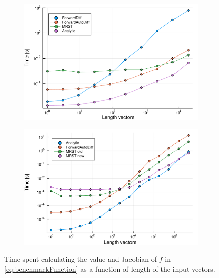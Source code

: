 \begin{figure}[htbp]
    \centering
    \begin{subfigure}[t]{0.48\textwidth}
        \centering
        \includegraphics[width = \textwidth]{figures/benchmark_all_ADs.pdf}
        \caption{}
        \label{fig:benchmarkAllADs}
    \end{subfigure}
    \begin{subfigure}[t]{0.49\textwidth}
        \centering
        \includegraphics[width = \textwidth]{figures/benchmark_long_vectors_4.pdf}
        \caption{}
        \label{fig:benchmarkLongVectors}
    \end{subfigure}
    \caption{Time spent calculating the value and Jacobian of $f$ in \eqref{eq:benchmarkFunction} as a function of length of the input vectors.}
    \label{fig:benchmarkAD}
\end{figure}
